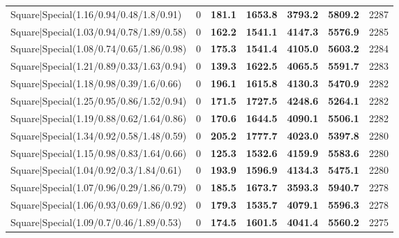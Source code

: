 \begin{tabular}{lrllllr}
 Square|Special(1.16/0.94/0.48/1.8/0.91)                       &             0   & \textbf{181.1} & \textbf{1653.8} & \textbf{3793.2} & \textbf{5809.2} &         2287 \\
 Square|Special(1.03/0.94/0.78/1.89/0.58)                      &             0   & \textbf{162.2} & \textbf{1541.1} & \textbf{4147.3} & \textbf{5576.9} &         2285 \\
 Square|Special(1.08/0.74/0.65/1.86/0.98)                      &             0   & \textbf{175.3} & \textbf{1541.4} & \textbf{4105.0} & \textbf{5603.2} &         2284 \\
 Square|Special(1.21/0.89/0.33/1.63/0.94)                      &             0   & \textbf{139.3} & \textbf{1622.5} & \textbf{4065.5} & \textbf{5591.7} &         2283 \\
 Square|Special(1.18/0.98/0.39/1.6/0.66)                       &             0   & \textbf{196.1} & \textbf{1615.8} & \textbf{4130.3} & \textbf{5470.9} &         2282 \\
 Square|Special(1.25/0.95/0.86/1.52/0.94)                      &             0   & \textbf{171.5} & \textbf{1727.5} & \textbf{4248.6} & \textbf{5264.1} &         2282 \\
 Square|Special(1.19/0.88/0.62/1.64/0.86)                      &             0   & \textbf{170.6} & \textbf{1644.5} & \textbf{4090.1} & \textbf{5506.1} &         2282 \\
 Square|Special(1.34/0.92/0.58/1.48/0.59)                      &             0   & \textbf{205.2} & \textbf{1777.7} & \textbf{4023.0} & \textbf{5397.8} &         2280 \\
 Square|Special(1.15/0.98/0.83/1.64/0.66)                      &             0   & \textbf{125.3} & \textbf{1532.6} & \textbf{4159.9} & \textbf{5583.6} &         2280 \\
 Square|Special(1.04/0.92/0.3/1.84/0.61)                       &             0   & \textbf{193.9} & \textbf{1596.9} & \textbf{4134.3} & \textbf{5475.1} &         2280 \\
 Square|Special(1.07/0.96/0.29/1.86/0.79)                      &             0   & \textbf{185.5} & \textbf{1673.7} & \textbf{3593.3} & \textbf{5940.7} &         2278 \\
 Square|Special(1.06/0.93/0.69/1.86/0.92)                      &             0   & \textbf{179.3} & \textbf{1535.7} & \textbf{4079.1} & \textbf{5596.3} &         2278 \\
 Square|Special(1.09/0.7/0.46/1.89/0.53)                       &             0   & \textbf{174.5} & \textbf{1601.5} & \textbf{4041.4} & \textbf{5560.2} &         2275 \\

\end{tabular}
